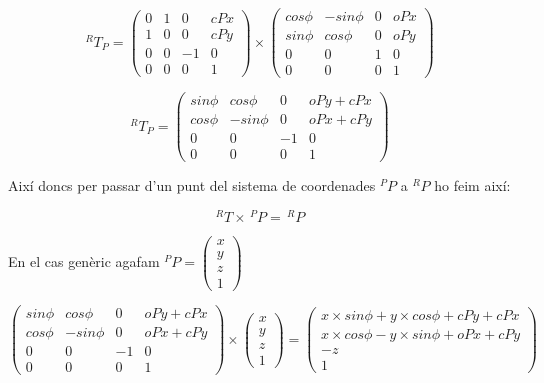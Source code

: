 $$ ^RT_P = 
\left( \begin{array}{ccc|c}
0 & 1 &  0 & cPx\\
1 & 0 &  0 & cPy\\
0 & 0 & -1 &   0\\
\hline
0 & 0 &  0 & 1
\end{array} \right) \times
\left( \begin{array}{ccc|c}
cos \phi & -sin \phi &  0 & oPx\\
sin \phi &  cos \phi &  0 & oPy\\
0        &         0 &  1 &   0\\
\hline
0 & 0 &  0 & 1
\end{array} \right) $$

$$ ^RT_P = 
\left( \begin{array}{ccc|c}
sin \phi &  cos \phi &  0 & oPy + cPx\\
cos \phi & -sin \phi &  0 & oPx + cPy\\
0        &         0 & -1 &   0\\
\hline
0 & 0 &  0 & 1
\end{array} \right)$$

Així doncs per passar d'un punt del sistema de coordenades $^PP$ a $^RP$ ho feim així:

$$^RT \times \,^PP = \,^RP$$

En el cas genèric agafam $^PP = 
\left( \begin{array}{c}
x \\
y \\
z \\
\hline
1
\end{array} \right)$

$$
\left( \begin{array}{ccc|c}
sin \phi &  cos \phi &  0 & oPy + cPx\\
cos \phi & -sin \phi &  0 & oPx + cPy\\
0        &         0 & -1 &   0\\
\hline
0 & 0 &  0 & 1
\end{array} \right)
\times
\left( \begin{array}{c}
x \\
y \\
z \\
\hline
1
\end{array} \right)
=
\left( \begin{array}{c}
x\times sin \phi + y \times cos \phi + cPy + cPx \\
x\times cos \phi - y \times sin \phi + oPx + cPy \\
-z \\
\hline
1
\end{array} \right)
$$

